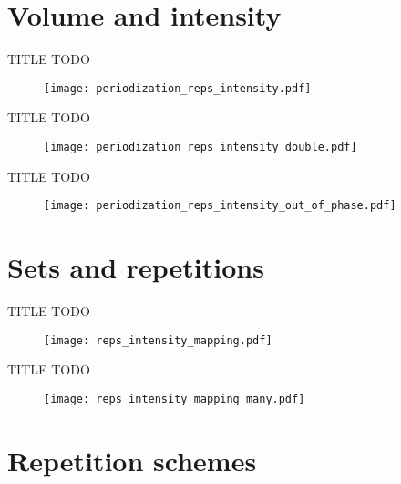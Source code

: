 \documentclass[11pt, aspectratio=149]{beamer}
\theoremstyle{plain}
\begin{document}
\section{Volume and intensity}

\begin{frame}[fragile, t]{TITLE}
	\vfill
	TODO
	\vfill
	\begin{figure}
		\centering
		\texttt{[image: periodization\_reps\_intensity.pdf]}
	\end{figure}
	\vfill
\end{frame}


\begin{frame}[fragile, t]{TITLE}
	\vfill
	TODO
	\vfill
	\begin{figure}
		\centering
		\texttt{[image: periodization\_reps\_intensity\_double.pdf]}
	\end{figure}
	\vfill
\end{frame}

\begin{frame}[fragile, t]{TITLE}
	\vfill
	TODO
	\vfill
	\begin{figure}
		\centering
		\texttt{[image: periodization\_reps\_intensity\_out\_of\_phase.pdf]}
	\end{figure}
	\vfill
\end{frame}


\section{Sets and repetitions}


\begin{frame}[fragile, t]{TITLE}
	\vfill
	TODO
	\vfill
	\begin{figure}
		\centering
		\texttt{[image: reps\_intensity\_mapping.pdf]}
	\end{figure}
	\vfill
\end{frame}


\begin{frame}[fragile, t]{TITLE}
	\vfill
	TODO
	\vfill
	\begin{figure}
		\centering
		\texttt{[image: reps\_intensity\_mapping\_many.pdf]}
	\end{figure}
	\vfill
\end{frame}


\section{Repetition schemes}
\end{document}
